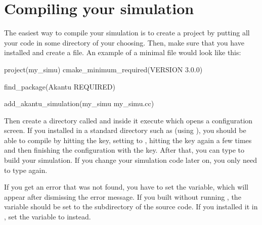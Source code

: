 \section{Compiling your simulation}
The easiest way to compile your simulation is to create a  project by putting all your code in some directory of your choosing. Then, make sure that you have  installed and create a  file. An example of a minimal  file would look like this:

\begin{cmake}
  project(my_simu)
  cmake_minimum_required(VERSION 3.0.0)

  find_package(Akantu REQUIRED)

  add_akantu_simulation(my_simu my_simu.cc)
\end{cmake}
%
Then create a directory called  and inside it execute  which opens a configuration screen. If you installed \akantu in a standard directory such as  (using ), you should be able to compile by hitting the  key, setting  to , hitting the  key again a few times and then finishing the configuration with the  key. After that, you can type  to build your simulation. If you change your simulation code later on, you only need to type  again.

If you get an error that  was not found, you have to set the  variable, which will appear after dismissing the error message. If you built \akantu without running , the variable should be set to the  subdirectory of the \akantu source code. If you installed it in , set the variable to  instead.

